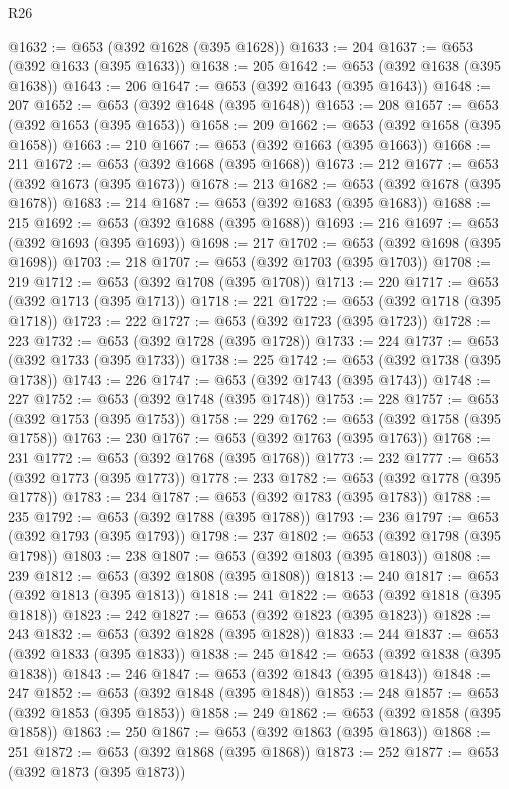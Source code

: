 \begin{lexlean}{R26}
\begin{coremodule}
@1632 := @653 (@392 @1628 (@395 @1628))
@1633 := 204
@1637 := @653 (@392 @1633 (@395 @1633))
@1638 := 205
@1642 := @653 (@392 @1638 (@395 @1638))
@1643 := 206
@1647 := @653 (@392 @1643 (@395 @1643))
@1648 := 207
@1652 := @653 (@392 @1648 (@395 @1648))
@1653 := 208
@1657 := @653 (@392 @1653 (@395 @1653))
@1658 := 209
@1662 := @653 (@392 @1658 (@395 @1658))
@1663 := 210
@1667 := @653 (@392 @1663 (@395 @1663))
@1668 := 211
@1672 := @653 (@392 @1668 (@395 @1668))
@1673 := 212
@1677 := @653 (@392 @1673 (@395 @1673))
@1678 := 213
@1682 := @653 (@392 @1678 (@395 @1678))
@1683 := 214
@1687 := @653 (@392 @1683 (@395 @1683))
@1688 := 215
@1692 := @653 (@392 @1688 (@395 @1688))
@1693 := 216
@1697 := @653 (@392 @1693 (@395 @1693))
@1698 := 217
@1702 := @653 (@392 @1698 (@395 @1698))
@1703 := 218
@1707 := @653 (@392 @1703 (@395 @1703))
@1708 := 219
@1712 := @653 (@392 @1708 (@395 @1708))
@1713 := 220
@1717 := @653 (@392 @1713 (@395 @1713))
@1718 := 221
@1722 := @653 (@392 @1718 (@395 @1718))
@1723 := 222
@1727 := @653 (@392 @1723 (@395 @1723))
@1728 := 223
@1732 := @653 (@392 @1728 (@395 @1728))
@1733 := 224
@1737 := @653 (@392 @1733 (@395 @1733))
@1738 := 225
@1742 := @653 (@392 @1738 (@395 @1738))
@1743 := 226
@1747 := @653 (@392 @1743 (@395 @1743))
@1748 := 227
@1752 := @653 (@392 @1748 (@395 @1748))
@1753 := 228
@1757 := @653 (@392 @1753 (@395 @1753))
@1758 := 229
@1762 := @653 (@392 @1758 (@395 @1758))
@1763 := 230
@1767 := @653 (@392 @1763 (@395 @1763))
@1768 := 231
@1772 := @653 (@392 @1768 (@395 @1768))
@1773 := 232
@1777 := @653 (@392 @1773 (@395 @1773))
@1778 := 233
@1782 := @653 (@392 @1778 (@395 @1778))
@1783 := 234
@1787 := @653 (@392 @1783 (@395 @1783))
@1788 := 235
@1792 := @653 (@392 @1788 (@395 @1788))
@1793 := 236
@1797 := @653 (@392 @1793 (@395 @1793))
@1798 := 237
@1802 := @653 (@392 @1798 (@395 @1798))
@1803 := 238
@1807 := @653 (@392 @1803 (@395 @1803))
@1808 := 239
@1812 := @653 (@392 @1808 (@395 @1808))
@1813 := 240
@1817 := @653 (@392 @1813 (@395 @1813))
@1818 := 241
@1822 := @653 (@392 @1818 (@395 @1818))
@1823 := 242
@1827 := @653 (@392 @1823 (@395 @1823))
@1828 := 243
@1832 := @653 (@392 @1828 (@395 @1828))
@1833 := 244
@1837 := @653 (@392 @1833 (@395 @1833))
@1838 := 245
@1842 := @653 (@392 @1838 (@395 @1838))
@1843 := 246
@1847 := @653 (@392 @1843 (@395 @1843))
@1848 := 247
@1852 := @653 (@392 @1848 (@395 @1848))
@1853 := 248
@1857 := @653 (@392 @1853 (@395 @1853))
@1858 := 249
@1862 := @653 (@392 @1858 (@395 @1858))
@1863 := 250
@1867 := @653 (@392 @1863 (@395 @1863))
@1868 := 251
@1872 := @653 (@392 @1868 (@395 @1868))
@1873 := 252
@1877 := @653 (@392 @1873 (@395 @1873))

\end{coremodule}
\end{lexlean}

